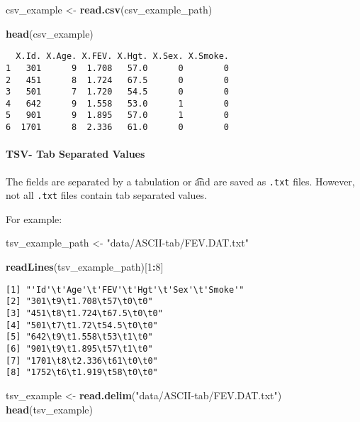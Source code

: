 \documentclass[12pt,]{article}
\newenvironment{Shaded}{\begin{snugshade}}{\end{snugshade}}
\newcommand{\KeywordTok}[1]{\textcolor[rgb]{0.13,0.29,0.53}{\textbf{#1}}}
\newcommand{\DecValTok}[1]{\textcolor[rgb]{0.00,0.00,0.81}{#1}}
\newcommand{\StringTok}[1]{\textcolor[rgb]{0.31,0.60,0.02}{#1}}
\newcommand{\OperatorTok}[1]{\textcolor[rgb]{0.81,0.36,0.00}{\textbf{#1}}}
\newcommand{\NormalTok}[1]{#1}
\let\oldparagraph\paragraph
\renewcommand{\paragraph}[1]{\oldparagraph{#1}\mbox{}}
\theoremstyle{definition}
\theoremstyle{definition}
\theoremstyle{definition}
\theoremstyle{remark}
\begin{document}
\begin{Shaded}
\begin{Highlighting}[]
\NormalTok{csv_example <-}\StringTok{ }\KeywordTok{read.csv}\NormalTok{(csv_example_path)}

\KeywordTok{head}\NormalTok{(csv_example)}
\end{Highlighting}
\end{Shaded}

\begin{verbatim}
  X.Id. X.Age. X.FEV. X.Hgt. X.Sex. X.Smoke.
1   301      9  1.708   57.0      0        0
2   451      8  1.724   67.5      0        0
3   501      7  1.720   54.5      0        0
4   642      9  1.558   53.0      1        0
5   901      9  1.895   57.0      1        0
6  1701      8  2.336   61.0      0        0
\end{verbatim}

\paragraph{TSV- Tab Separated Values}\label{tsv--tab-separated-values}

The fields are separated by a tabulation or \t and are saved as
\texttt{.txt} files. However, not all \texttt{.txt} files contain tab
separated values.

For example:

\begin{Shaded}
\begin{Highlighting}[]
\NormalTok{tsv_example_path <-}\StringTok{ "data/ASCII-tab/FEV.DAT.txt"}

\KeywordTok{readLines}\NormalTok{(tsv_example_path)[}\DecValTok{1}\OperatorTok{:}\DecValTok{8}\NormalTok{]}
\end{Highlighting}
\end{Shaded}

\begin{verbatim}
[1] "'Id'\t'Age'\t'FEV'\t'Hgt'\t'Sex'\t'Smoke'"
[2] "301\t9\t1.708\t57\t0\t0"                  
[3] "451\t8\t1.724\t67.5\t0\t0"                
[4] "501\t7\t1.72\t54.5\t0\t0"                 
[5] "642\t9\t1.558\t53\t1\t0"                  
[6] "901\t9\t1.895\t57\t1\t0"                  
[7] "1701\t8\t2.336\t61\t0\t0"                 
[8] "1752\t6\t1.919\t58\t0\t0"                 
\end{verbatim}

\begin{Shaded}
\begin{Highlighting}[]
\NormalTok{tsv_example <-}\StringTok{ }\KeywordTok{read.delim}\NormalTok{(}\StringTok{"data/ASCII-tab/FEV.DAT.txt"}\NormalTok{)}
\KeywordTok{head}\NormalTok{(tsv_example)}
\end{Highlighting}
\end{Shaded}
\end{document}
